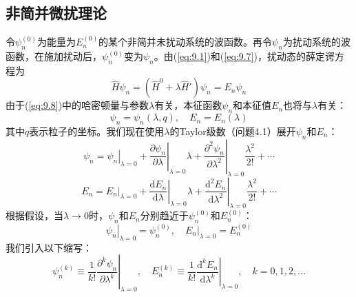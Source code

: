 \subsection*{非简并微扰理论}
    令$\psi_n^{\left(0\right)}$为能量为$E_n^{\left(0\right)}$的某个非简并未扰动系统的波函数。再令$\psi_n$为扰动系统的波函数，在施加扰动后，$\psi_n^{\left(0\right)}$变为$\psi_n$。由(\ref{eq:9.1})和(\ref{eq:9.7})，扰动态的薛定谔方程为
    \begin{equation}
        \hat{H}\psi_n = \left(\hat{H}^0 + \lambda \hat{H}'\right)\psi_n = E_n \psi_n
        \label{eq:9.8}
    \end{equation}
    由于(\ref{eq:9.8})中的哈密顿量与参数$\lambda$有关，本征函数$\psi_n$和本征值$E_n$也将与$\lambda$有关：
    \begin{equation*}
        \psi_n = \psi_n\left(\lambda, q\right), \quad E_n = E_n\left(\lambda\right)
    \end{equation*}
    其中$q$表示粒子的坐标。我们现在使用$\lambda$的Taylor级数（问题4.1）展开$\psi_n$和$E_n$：
    \begin{equation}
        \psi_n = \left. \psi_n \right|_{\lambda=0} + \left. \frac{\partial \psi_n}{\partial \lambda} \right|_{\lambda=0}\lambda + \left. \frac{\partial^2 \psi_n}{\partial \lambda^2} \right|_{\lambda=0}\frac{\lambda^2}{2!} + \cdots
        \label{eq:9.9}
    \end{equation}
    \begin{equation}
        E_n = \left. E_n \right|_{\lambda=0} + \left. \frac{\mathrm{d} E_n}{\mathrm{d} \lambda} \right|_{\lambda=0}\lambda + \left. \frac{\mathrm{d}^2 E_n}{\mathrm{d} \lambda^2} \right|_{\lambda=0}\frac{\lambda^2}{2!} + \cdots
        \label{eq:9.10}
    \end{equation}
    根据假设，当$\lambda \to 0$时，$\psi_n$和$E_n$分别趋近于$\psi_n^{\left(0\right)}$和$E_n^{\left(0\right)}$：
    \begin{equation}
        \left. \psi_n \right|_{\lambda=0} = \psi_n^{\left(0\right)}, \quad \left. E_n \right|_{\lambda=0} = E_n^{\left(0\right)}
        \label{eq:9.11}
    \end{equation}
    我们引入以下缩写：
    \begin{equation}
        \psi_n^{\left(k\right)} \equiv \frac{1}{k!} \left. \frac{\partial^k \psi_n}{\partial \lambda^k} \right|_{\lambda=0}, \quad E_n^{\left(k\right)} \equiv \frac{1}{k!} \left. \frac{\mathrm{d}^k E_n}{\mathrm{d} \lambda^k} \right|_{\lambda=0}, \quad k = 0, 1, 2, \ldots
        \label{eq:9.12}
    \end{equation}
